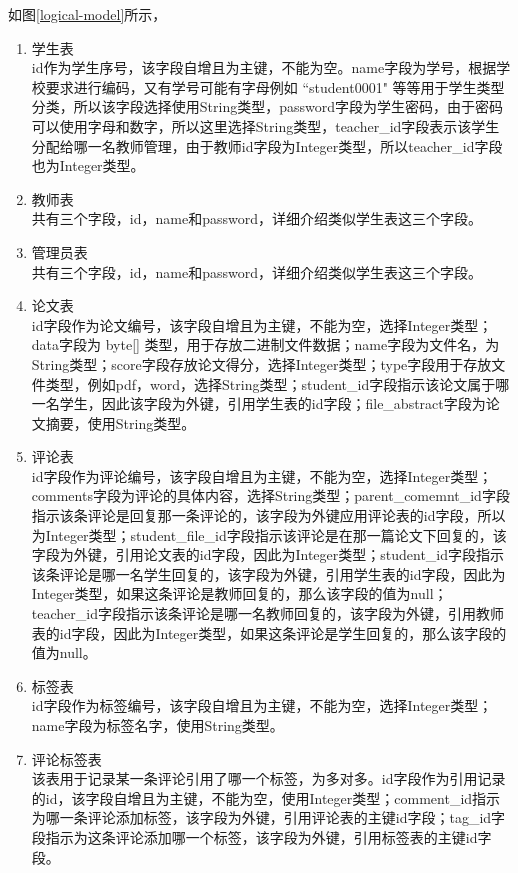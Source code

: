 如图\ref{logical-model}所示，
\begin{enumerate}
    \item 学生表\\
          id作为学生序号，该字段自增且为主键，不能为空。name字段为学号，根据学校要求进行编码，又有学号可能有字母例如 “student0001" 等等用于学生类型分类，所以该字段选择使用String类型，password字段为学生密码，由于密码可以使用字母和数字，所以这里选择String类型，teacher\_id字段表示该学生分配给哪一名教师管理，由于教师id字段为Integer类型，所以teacher\_id字段也为Integer类型。
    \item 教师表\\
          共有三个字段，id，name和password，详细介绍类似学生表这三个字段。
    \item 管理员表\\
          共有三个字段，id，name和password，详细介绍类似学生表这三个字段。
    \item 论文表\\
          id字段作为论文编号，该字段自增且为主键，不能为空，选择Integer类型；data字段为 byte[] 类型，用于存放二进制文件数据；name字段为文件名，为String类型；score字段存放论文得分，选择Integer类型；type字段用于存放文件类型，例如pdf，word，选择String类型；student\_id字段指示该论文属于哪一名学生，因此该字段为外键，引用学生表的id字段；file\_abstract字段为论文摘要，使用String类型。
    \item 评论表\\
          id字段作为评论编号，该字段自增且为主键，不能为空，选择Integer类型；comments字段为评论的具体内容，选择String类型；parent\_comemnt\_id字段指示该条评论是回复那一条评论的，该字段为外键应用评论表的id字段，所以为Integer类型；student\_file\_id字段指示该评论是在那一篇论文下回复的，该字段为外键，引用论文表的id字段，因此为Integer类型；student\_id字段指示该条评论是哪一名学生回复的，该字段为外键，引用学生表的id字段，因此为Integer类型，如果这条评论是教师回复的，那么该字段的值为null；teacher\_id字段指示该条评论是哪一名教师回复的，该字段为外键，引用教师表的id字段，因此为Integer类型，如果这条评论是学生回复的，那么该字段的值为null。
    \item 标签表\\
          id字段作为标签编号，该字段自增且为主键，不能为空，选择Integer类型；name字段为标签名字，使用String类型。
    \item 评论标签表\\
          该表用于记录某一条评论引用了哪一个标签，为多对多。id字段作为引用记录的id，该字段自增且为主键，不能为空，使用Integer类型；comment\_id指示为哪一条评论添加标签，该字段为外键，引用评论表的主键id字段；tag\_id字段指示为这条评论添加哪一个标签，该字段为外键，引用标签表的主键id字段。
\end{enumerate}

